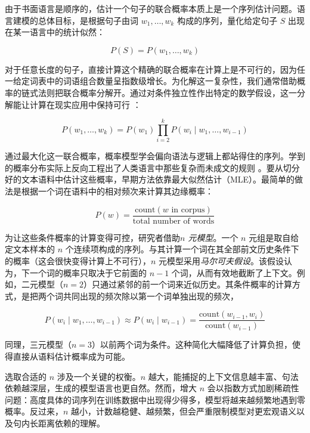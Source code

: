 由于书面语言是顺序的，估计一个句子的联合概率本质上是一个序列估计问题。语言建模的总体目标，是根据句子由词 $w_1, \dots, w_k$ 构成的序列，量化给定句子 $S$ 出现在某一语言中的统计似然：

\begin{equation}
    \label{eq:language-sequence}
    P(S) = P(w_1, \dots, w_k)
\end{equation}

对于任意长度的句子，直接计算这个精确的联合概率在计算上是不可行的，因为任一给定词表中的词语组合数量呈指数级增长。为化解这一复杂性，我们通常借助概率的链式法则把联合概率分解开。通过对条件独立性作出特定的数学假设，这一分解能让计算在现实应用中保持可行 \citep{jm3}：

\begin{equation}
\label{eq:bigram}
    P(w_1, \dots, w_k) = P(w_1) \prod_{i=2}^{k} P(w_i \mid w_1, \dots, w_{i-1})
\end{equation}

通过最大化这一联合概率，概率模型学会偏向语法与逻辑上都站得住的序列。学到的概率分布实际上反向工程出了人类语言中那些复杂而未成文的规则 \citep{manning1999foundations}。要从切分好的文本语料中估计这些概率，早期方法依靠最大似然估计（MLE）。最简单的做法是根据一个词在语料中的相对频次来计算其边缘概率：

\begin{equation}
\label{eq:mle-word-prob}
    P(w) = \frac{\text{count}(w \text{ in corpus})}{\text{total number of words}}
\end{equation}

为让这些条件概率的计算变得可控，研究者借助\emph{$n$ 元模型}。一个 $n$ 元组是取自给定文本样本的 $n$ 个连续项构成的序列。与其计算一个词在其全部前文历史条件下的概率（这会很快变得计算上不可行），$n$ 元模型采用\emph{马尔可夫假设}。该假设认为，下一个词的概率只取决于它前面的 $n-1$ 个词，从而有效地截断了上下文。例如，二元模型（$n=2$）只通过紧邻的前一个词来近似历史。其条件概率的计算方式，是把两个词共同出现的频次除以第一个词单独出现的频次，

\begin{equation}
    P(w_i \mid w_1, \dots, w_{i-1}) \approx P(w_i \mid w_{i-1}) = \frac{\text{count}(w_{i-1}, w_i)}{\text{count}(w_{i-1})}
\end{equation}

同理，三元模型（$n=3$）以前两个词为条件。这种简化大幅降低了计算负担，使得直接从语料估计概率成为可能。

选取合适的 $n$ 涉及一个关键的权衡。$n$ 越大，能捕捉的上下文信息越丰富、句法依赖越深层，生成的模型语言也更自然。然而，增大 $n$ 会以指数方式加剧稀疏性问题：高度具体的词序列在训练数据中出现得少得多，模型将越来越频繁地遇到零概率。反过来，$n$ 越小，计数越稳健、越频繁，但会严重限制模型对更宏观语义以及句内长距离依赖的理解。

